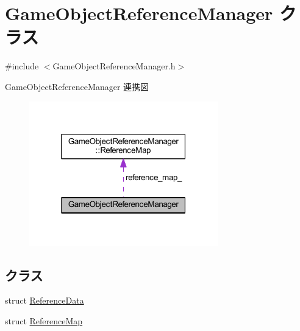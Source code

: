\hypertarget{class_game_object_reference_manager}{}\section{Game\+Object\+Reference\+Manager クラス}
\label{class_game_object_reference_manager}


{\ttfamily \#include $<$Game\+Object\+Reference\+Manager.\+h$>$}



Game\+Object\+Reference\+Manager 連携図\nopagebreak
\begin{figure}[H]
\begin{center}
\leavevmode
\includegraphics[width=232pt]{class_game_object_reference_manager__coll__graph}
\end{center}
\end{figure}
\subsection*{クラス}
\begin{DoxyCompactItemize}
\item 
struct \mbox{\hyperlink{struct_game_object_reference_manager_1_1_reference_data}{Reference\+Data}}
\item 
struct \mbox{\hyperlink{struct_game_object_reference_manager_1_1_reference_map}{Reference\+Map}}
\end{DoxyCompactItemize}

